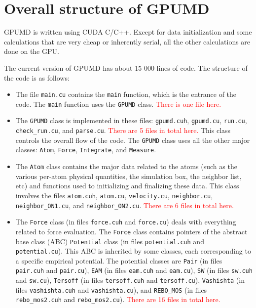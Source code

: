 \documentclass[12pt,a4paper]{report}
\begin{document}
\section{Overall structure of GPUMD}

GPUMD is written using CUDA C/C++. Except for data initialization and some calculations that are very cheap or inherently serial, all the other calculations are done on the GPU.

The current version of GPUMD has about 15 000 lines of code. The structure of the code is as follows:
\begin{itemize}
\item The file \verb"main.cu" contains the \verb"main" function, which is the entrance of the code. The \verb"main" function uses the \verb"GPUMD" class. \textcolor{red}{There is one file here.}


\item The \verb"GPUMD" class is implemented in these files: \verb"gpumd.cuh", \verb"gpumd.cu", \verb"run.cu", \verb"check_run.cu", and \verb"parse.cu". \textcolor{red}{There are 5 files in total here.} This class controls the overall flow of the code. The \verb"GPUMD" class uses all the other major classes: \verb"Atom", \verb"Force", \verb"Integrate", and \verb"Measure". 

\item The \verb"Atom" class contains the major data related to the atoms (such as the various per-atom physical quantities, the simulation box, the neighbor list, etc) and functions used to initializing and finalizing these data. This class involves the files \verb"atom.cuh", \verb"atom.cu", \verb"velocity.cu", \verb"neighbor.cu", \verb"neighbor_ON1.cu", and \verb"neighbor_ON2.cu". \textcolor{red}{There are 6 files in total here.}

\item The \verb"Force" class (in files \verb"force.cuh" and \verb"force.cu") deals with everything related to force evaluation. The \verb"Force" class contains pointers of the abstract base class (ABC) \verb"Potential" class (in files \verb"potential.cuh" and \verb"potential.cu"). This ABC is inherited by some classes, each corresponding to a specific empirical potential. The potential classes are \verb"Pair" (in files \verb"pair.cuh" and \verb"pair.cu"), \verb"EAM" (in files \verb"eam.cuh" and \verb"eam.cu"), \verb"SW" (in files \verb"sw.cuh" and \verb"sw.cu"), \verb"Tersoff" (in files \verb"tersoff.cuh" and \verb"tersoff.cu"), \verb"Vashishta" (in files \verb"vashishta.cuh" and \verb"vashishta.cu"), and \verb"REBO_MOS" (in files \verb"rebo_mos2.cuh" and \verb"rebo_mos2.cu"). \textcolor{red}{There are 16 files in total here.}


\end{itemize}
\end{document}
